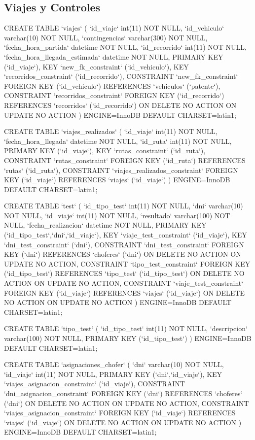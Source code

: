 \subsection{Viajes y Controles}

\begin{sql}

CREATE TABLE  `viajes` (
  `id_viaje` int(11) NOT NULL,
  `id_vehiculo` varchar(10) NOT NULL,
  `contingencias` varchar(300) NOT NULL,
  `fecha_hora_partida` datetime NOT NULL,
  `id_recorrido` int(11) NOT NULL,
  `fecha_hora_llegada_estimada` datetime NOT NULL,
  PRIMARY KEY (`id_viaje`),
  KEY `new_fk_constraint` (`id_vehiculo`),
  KEY `recorridos_constraint` (`id_recorrido`),
  CONSTRAINT `new_fk_constraint` FOREIGN KEY (`id_vehiculo`) REFERENCES `vehiculos` (`patente`),
  CONSTRAINT `recorridos_constraint` FOREIGN KEY (`id_recorrido`) 
  REFERENCES `recorridos` (`id_recorrido`) ON DELETE NO ACTION ON UPDATE NO ACTION
) ENGINE=InnoDB DEFAULT CHARSET=latin1;

CREATE TABLE  `viajes_realizados` (
  `id_viaje` int(11) NOT NULL,
  `fecha_hora_llegada` datetime NOT NULL,
  `id_ruta` int(11) NOT NULL,
  PRIMARY KEY (`id_viaje`),
  KEY `rutas_constraint` (`id_ruta`),
  CONSTRAINT `rutas_constraint` FOREIGN KEY (`id_ruta`) REFERENCES `rutas` (`id_ruta`),
  CONSTRAINT `viajes_realizados_constraint` FOREIGN KEY (`id_viaje`) 
  REFERENCES `viajes` (`id_viaje`)
) ENGINE=InnoDB DEFAULT CHARSET=latin1;

CREATE TABLE  `test` (
  `id_tipo_test` int(11) NOT NULL,
  `dni` varchar(10) NOT NULL,
  `id_viaje` int(11) NOT NULL,
  `resultado` varchar(100) NOT NULL,
  `fecha_realizacion` datetime NOT NULL,
  PRIMARY KEY (`id_tipo_test`,`dni`,`id_viaje`),
  KEY `viaje_test_constraint` (`id_viaje`),
  KEY `dni_test_constraint` (`dni`),
  CONSTRAINT `dni_test_constraint` FOREIGN KEY (`dni`) 
  REFERENCES `choferes` (`dni`) ON DELETE NO ACTION ON UPDATE NO ACTION,
  CONSTRAINT `tipo_test_constraint` FOREIGN KEY (`id_tipo_test`) 
  REFERENCES `tipo_test` (`id_tipo_test`) ON DELETE NO ACTION ON UPDATE NO ACTION,
  CONSTRAINT `viaje_test_constraint` FOREIGN KEY (`id_viaje`) 
  REFERENCES `viajes` (`id_viaje`) ON DELETE NO ACTION ON UPDATE NO ACTION
) ENGINE=InnoDB DEFAULT CHARSET=latin1;

CREATE TABLE  `tipo_test` (
  `id_tipo_test` int(11) NOT NULL,
  `descripcion` varchar(100) NOT NULL,
  PRIMARY KEY (`id_tipo_test`)
) ENGINE=InnoDB DEFAULT CHARSET=latin1;

CREATE TABLE  `asignaciones_chofer` (
  `dni` varchar(10) NOT NULL,
  `id_viaje` int(11) NOT NULL,
  PRIMARY KEY (`dni`,`id_viaje`),
  KEY `viajes_asignacion_constraint` (`id_viaje`),
  CONSTRAINT `dni_asignacion_constraint` FOREIGN KEY (`dni`) 
  REFERENCES `choferes` (`dni`) ON DELETE NO ACTION ON UPDATE NO ACTION,
  CONSTRAINT `viajes_asignacion_constraint` FOREIGN KEY (`id_viaje`) 
  REFERENCES `viajes` (`id_viaje`) ON DELETE NO ACTION ON UPDATE NO ACTION
) ENGINE=InnoDB DEFAULT CHARSET=latin1;

\end{sql}

